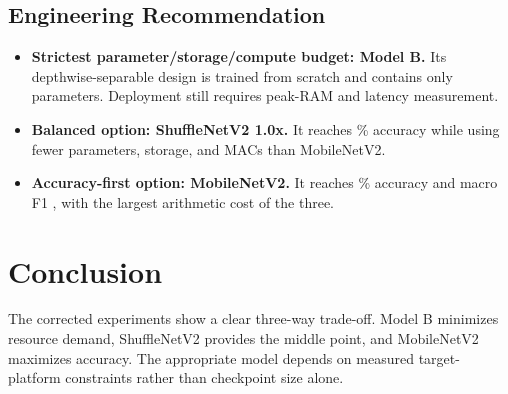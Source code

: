 \documentclass[10pt,a4paper]{article}
\begin{document}
\subsection{Engineering Recommendation}
\begin{itemize}[leftmargin=*]
\item \textbf{Strictest parameter/storage/compute budget: Model B.} Its depthwise-separable design is trained from scratch and contains only \ModelBParams{} parameters. Deployment still requires peak-RAM and latency measurement.
\item \textbf{Balanced option: ShuffleNetV2 1.0x.} It reaches \ShuffleAccuracy\% accuracy while using fewer parameters, storage, and MACs than MobileNetV2.
\item \textbf{Accuracy-first option: MobileNetV2.} It reaches \MobileAccuracy\% accuracy and macro F1 \MobileFOne, with the largest arithmetic cost of the three.
\end{itemize}

\section{Conclusion}
The corrected experiments show a clear three-way trade-off. Model B minimizes resource demand, ShuffleNetV2 provides the middle point, and MobileNetV2 maximizes accuracy. The appropriate model depends on measured target-platform constraints rather than checkpoint size alone.
\end{document}
